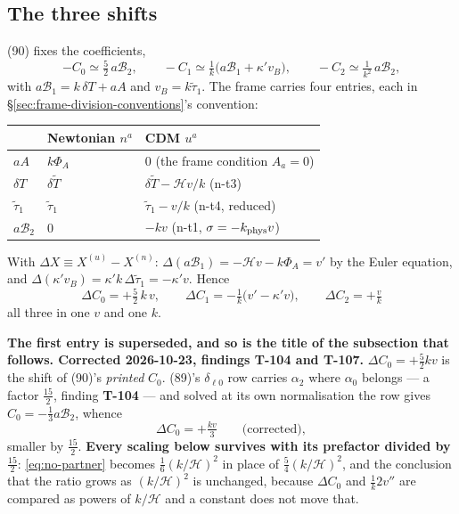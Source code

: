 \subsection{The three shifts}

(90) fixes the coefficients,
\begin{equation}
  -C_0\simeq\tfrac52\,a\mathcal B_2,\qquad
  -C_1\simeq\tfrac1k\big(a\mathcal B_1+\kappa'v_B\big),\qquad
  -C_2\simeq\tfrac1{k^2}\,a\mathcal B_2 ,
  \label{eq:C-from-B}
\end{equation}
with $a\mathcal B_1=k\,\delta T+aA$ and $v_B=k\tilde\tau_1$. The frame carries
four entries, each in \S\ref{sec:frame-division-conventions}'s convention:

\begin{center}
\begin{tabular}{lll}
\hline
 & Newtonian $n^a$ & CDM $u^a$ \\
\hline
$aA$ & $k\Phi_A$ & $0$ \quad(the frame condition $A_a=0$) \\
$\delta T$ & $\delta\tilde T$ & $\delta\tilde T-\mathcal Hv/k$ \quad(n-t3) \\
$\tilde\tau_1$ & $\tilde\tau_1$ & $\tilde\tau_1-v/k$ \quad(n-t4, reduced) \\
$a\mathcal B_2$ & $0$ & $-kv$ \quad(n-t1, $\sigma=-k_{\rm phys}v$) \\
\hline
\end{tabular}
\end{center}

\noindent
With $\Delta X\equiv X^{(u)}-X^{(n)}$: $\Delta(a\mathcal B_1)
=-\mathcal Hv-k\Phi_A=v'$ by the Euler equation, and $\Delta(\kappa'v_B)
=\kappa'k\,\Delta\tilde\tau_1=-\kappa'v$. Hence
\begin{equation}
  \boxed{\;
  \Delta C_0=+\tfrac52\,k\,v,\qquad
  \Delta C_1=-\tfrac1k\big(v'-\kappa'v\big),\qquad
  \Delta C_2=+\tfrac{v}{k}\;}
  \label{eq:three-shifts}
\end{equation}
all three in one $v$ and one $k$.

\textbf{The first entry is superseded, and so is the title of the subsection
that follows. \textnormal{Corrected 2026-10-23, findings T-104 and T-107.}}
$\Delta C_0=+\tfrac52kv$ is the shift of (90)'s \emph{printed} $C_0$. (89)'s
$\delta_{\ell0}$ row carries $\alpha_2$ where $\alpha_0$ belongs --- a factor
$\tfrac{15}2$, finding \textbf{T-104} --- and solved at its own normalisation
the row gives $C_0=-\tfrac13a\mathcal B_2$, whence
\begin{equation}
  \Delta C_0=+\tfrac{kv}{3}\qquad\text{(corrected)},
  \label{eq:dc0-corrected}
\end{equation}
smaller by $\tfrac{15}2$. \textbf{Every scaling below survives with its
prefactor divided by $\tfrac{15}2$}: \eqref{eq:no-partner} becomes
$\tfrac16(k/\mathcal H)^2$ in place of $\tfrac54(k/\mathcal H)^2$, and the
conclusion that the ratio grows as $(k/\mathcal H)^2$ is unchanged, because
$\Delta C_0$ and $\tfrac1k2v''$ are compared as powers of $k/\mathcal H$ and a
constant does not move that.

